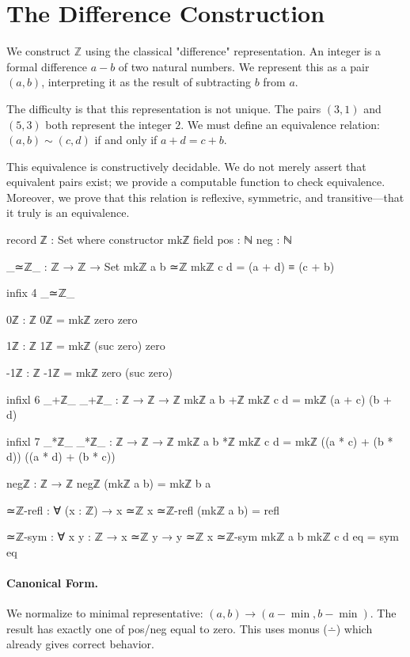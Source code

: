 \documentclass[11pt,a4paper]{book}
\begin{document}
\section{The Difference Construction}

We construct $\mathbb{Z}$ using the classical "difference" representation. An integer 
is a formal difference $a - b$ of two natural numbers. We represent this as a pair $(a, b)$, 
interpreting it as the result of subtracting $b$ from $a$.

The difficulty is that this representation is not unique. The pairs $(3,1)$ and $(5,3)$ 
both represent the integer $2$. We must define an equivalence relation: $(a,b) \sim (c,d)$ 
if and only if $a + d = c + b$.

This equivalence is constructively decidable. We do not merely assert that equivalent 
pairs exist; we provide a computable function to check equivalence. Moreover, we prove 
that this relation is reflexive, symmetric, and transitive—that it truly is an equivalence.

\begin{code}
record ℤ : Set where
  constructor mkℤ
  field
    pos : ℕ
    neg : ℕ

_≃ℤ_ : ℤ → ℤ → Set
mkℤ a b ≃ℤ mkℤ c d = (a + d) ≡ (c + b)

infix 4 _≃ℤ_

0ℤ : ℤ
0ℤ = mkℤ zero zero

1ℤ : ℤ
1ℤ = mkℤ (suc zero) zero

-1ℤ : ℤ
-1ℤ = mkℤ zero (suc zero)

infixl 6 _+ℤ_
_+ℤ_ : ℤ → ℤ → ℤ
mkℤ a b +ℤ mkℤ c d = mkℤ (a + c) (b + d)

infixl 7 _*ℤ_
_*ℤ_ : ℤ → ℤ → ℤ
mkℤ a b *ℤ mkℤ c d = mkℤ ((a * c) + (b * d)) ((a * d) + (b * c))

negℤ : ℤ → ℤ
negℤ (mkℤ a b) = mkℤ b a

≃ℤ-refl : ∀ (x : ℤ) → x ≃ℤ x
≃ℤ-refl (mkℤ a b) = refl

≃ℤ-sym : ∀ {x y : ℤ} → x ≃ℤ y → y ≃ℤ x
≃ℤ-sym {mkℤ a b} {mkℤ c d} eq = sym eq
\end{code}

\paragraph{Canonical Form.}
We normalize to minimal representative: $(a,b) \to (a-\min, b-\min)$.
The result has exactly one of pos/neg equal to zero. This uses monus ($\dotminus$)
which already gives correct behavior.
\end{document}
